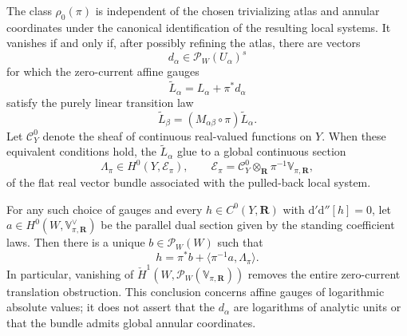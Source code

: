\begin{proposition}
\label{prop:p062-polyannulus-radiance-obstruction}
The class $\rho_0(\pi)$ is independent of the chosen trivializing atlas and
annular coordinates under the canonical identification of the resulting
local systems.  It vanishes if and only if, after possibly refining the
atlas, there are vectors
\[
 d_\alpha\in\mathscr P_W(U_\alpha)^s
\]
for which the zero-current affine gauges
\begin{equation}
\label{eq:p062-radiance-gauged-logarithms}
 \widetilde L_\alpha=L_\alpha+\pi^*d_\alpha
\end{equation}
satisfy the purely linear transition law
\begin{equation}
\label{eq:p062-radiance-linear-transition}
 \widetilde L_\beta
 =(M_{\alpha\beta}\circ\pi)\widetilde L_\alpha.
\end{equation}
Let $\mathscr C_Y^0$ denote the sheaf of continuous real-valued functions on
$Y$.  When these equivalent conditions hold, the $\widetilde L_\alpha$ glue
to a global continuous section
\[
 \Lambda_\pi\in H^0(Y,\mathcal E_\pi),
 \qquad
 \mathcal E_\pi
 =\mathscr C_Y^0\otimes_{\mathbf R}\pi^{-1}\mathbb V_{\pi,\mathbf R},
\]
of the flat real vector bundle associated with the pulled-back local system.

For any such choice of gauges and every $h\in C^0(Y,\mathbf R)$ with
$\mathrm d'\mathrm d''[h]=0$, let
$a\in H^0(W,\mathbb V_{\pi,\mathbf R}^\vee)$ be the parallel dual section
given by the standing coefficient laws.  Then there
is a unique $b\in\mathscr P_W(W)$ such that
\begin{equation}
\label{eq:p062-radiance-global-coefficient-formula}
 h=\pi^*b+\langle\pi^{-1}a,\Lambda_\pi\rangle.
\end{equation}
In particular, vanishing of
$\check H^1(W,\mathscr P_W(\mathbb V_{\pi,\mathbf R}))$ removes the entire
zero-current translation obstruction.  This conclusion concerns affine
gauges of logarithmic absolute values; it does not assert that the
$d_\alpha$ are logarithms of analytic units or that the bundle admits global
annular coordinates.
\end{proposition}
